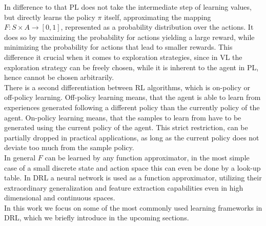\documentclass[11pt,a4paper]{article}
\begin{document}
	In difference to that PL does not take the intermediate step of learning values, but directly learns the policy $\pi$ itself, approximating the mapping $F : S \times A \rightarrow [0, 1]$, represented as a probability distribution over the actions.
	It does so by maximizing the probability for actions yielding a large reward, while minimizing the probability for actions that lead to smaller rewards.
	This difference it crucial when it comes to exploration strategies, since in VL the exploration strategy can be freely chosen, while it is inherent to the agent in PL, hence cannot be chosen arbitrarily.\\

	There is a second differentiation between RL algorithms, which is on-policy or off-policy learning.
	Off-policy learning means, that the agent is able to learn from experiences generated following a different policy than the currently policy of the agent.
	On-policy learning means, that the samples to learn from have to be generated using the current policy of the agent.
	This strict restriction, can be partially dropped in practical applications, as long as the current policy does not deviate too much from the sample policy.\\

	In general $F$ can be learned by any function approximator, in the most simple case of a small discrete state and action space this can even be done by a look-up table.
	In DRL a neural network is used as a function approximator, utilizing their extraordinary generalization and feature extraction capabilities even in high dimensional and continuous spaces.\\
	In this work we focus on some of the most commonly used learning frameworks in DRL, which we briefly introduce in the upcoming sections.\\
\end{document}
